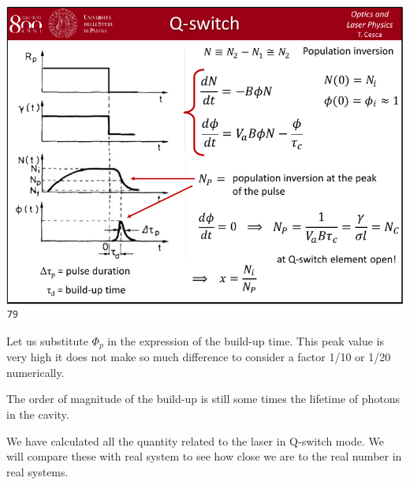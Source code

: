 \documentclass[../main/main.tex]{subfiles}
\begin{document}
\begin{minipage}[]{0.5\linewidth}
\centering
\includegraphics[page=16,width=1\textwidth]{../lessons/pdf_file/15_lecture.pdf}
\end{minipage}
\hspace{0.3cm}\vspace{0.3cm}
\begin{minipage}[c]{0.47\linewidth}

Let us substitute \( \Phi _p \) in the expression of the build-up time. This peak value is very high it does not make so much difference to consider a factor 1/10 or 1/20 numerically.

The order of magnitude of the build-up is still some times the lifetime of photons in the cavity.

\end{minipage}

We have calculated all the quantity related to the laser in Q-switch mode. We will compare these with real system to see how close we are to the real number in real systems.
\end{document}
